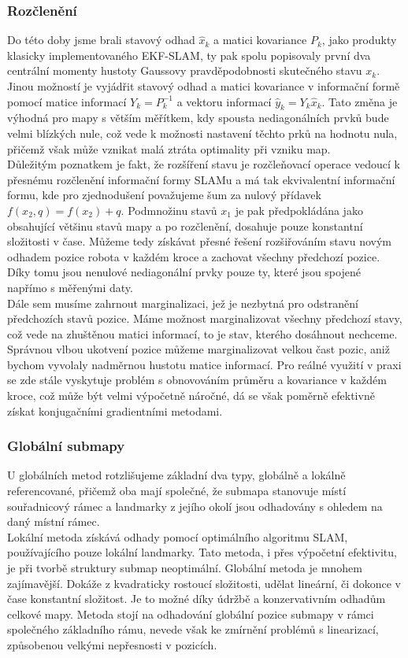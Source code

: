 \documentclass[11pt]{article}
\begin{document}
\subsubsection{Rozčlenění}
Do této doby jsme brali stavový odhad $\hat{x}_k$ a matici kovariance $P_k$, jako produkty klasicky implementovaného EKF-SLAM, ty pak spolu popisovaly první dva centrální momenty hustoty Gaussovy pravděpodobnosti skutečného stavu $x_k$. Jinou možností je vyjádřit stavový odhad a matici kovariance v informační formě pomocí matice informací $Y_k=P^{-1}_k$ a vektoru informací $\hat{y}_k=Y_k\hat{x}_k$. Tato změna je výhodná pro mapy s větším měřítkem, kdy spousta nediagonálních prvků bude velmi blízkých nule, což vede k možnosti nastavení těchto prků na hodnotu nula, přičemž však může vznikat malá ztráta optimality při vzniku map. \\
\indent Důležitým poznatkem je fakt, že rozšíření stavu je rozčleňovací operace vedoucí k přesnému rozčlenění informační formy SLAMu a má tak ekvivalentní informační formu, kde pro zjednodušení považujeme šum za nulový přídavek $f(x_2,q)=f(x_2)+q$. Podmnožinu stavů $x_1$ je pak předpokládána jako obsahující většinu stavů mapy a po rozčlenění, dosahuje pouze konstantní složitosti v čase. Můžeme tedy získávat přesné řešení rozšiřováním stavu novým odhadem pozice robota v každém kroce a zachovat všechny předchozí pozice. Díky tomu jsou nenulové nediagonální prvky pouze ty, které jsou spojené napřímo s měřenými daty.  \\
\indent Dále sem musíme zahrnout marginalizaci, jež je nezbytná pro odstranění předchozích stavů pozice. Máme možnost marginalizovat všechny předchozí stavy, což vede na zhuštěnou matici informací, to je stav, kterého dosáhnout nechceme. Správnou vlbou ukotvení pozice můžeme marginalizovat velkou čast pozic, aniž bychom vyvolaly nadměrnou hustotu matice informací. Pro reálné využití v praxi se zde stále vyskytuje problém s obnovováním průměru a kovariance v každém kroce, což může být velmi výpočetně náročné, dá se však poměrně efektivně získat konjugačními gradientními metodami. 
\subsubsection{Globální submapy}
U globálních metod rotzlišujeme základní dva typy, globálně a lokálně referencované, přičemž oba mají společné, že submapa stanovuje místí souřadnicový rámec a landmarky z jejího okolí jsou odhadovány s ohledem na daný místní rámec. \\
\indent Lokální metoda získává odhady pomocí optimálního algoritmu SLAM, používajícího pouze lokální landmarky. Tato metoda, i přes výpočetní efektivitu, je při tvorbě struktury submap neoptimální. Globální metoda je mnohem zajímavější. Dokáže z kvadraticky rostoucí složitosti, udělat lineární, či dokonce v čase konstantní složitost. Je to možné díky údržbě a konzervativním odhadům celkové mapy. Metoda stojí na odhadování globální pozice submapy v rámci společného základního rámu, nevede však ke zmírnění problémů s linearizací, způsobenou velkými nepřesnosti v pozicích.
\end{document}
